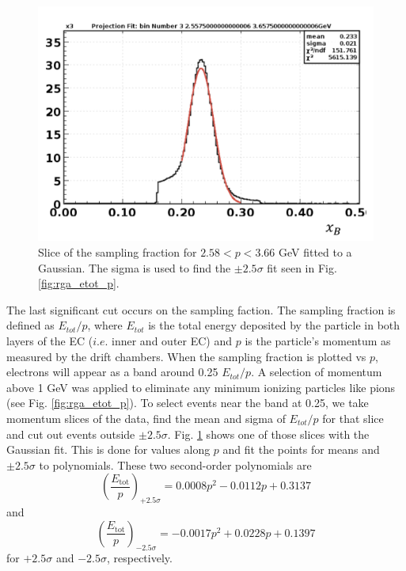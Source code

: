 \begin{figure}[h!]
	\centering
	\includegraphics[width=0.9\linewidth]{figures/rga/Fit_slice_3.png}
	\caption{Slice of the sampling fraction for $2.58<p<3.66$ GeV fitted to a Gaussian. The sigma is used to find the $\pm2.5 \sigma$ fit seen in Fig. \ref{fig:rga_etot_p}.}
	\label{fig:sf_slice}
\end{figure}

The last significant cut occurs on the sampling faction. The sampling fraction is defined as $E_{tot}/p$, where $E_{tot}$ is the total energy deposited by the particle in both layers of the EC ($i.e.$ inner and outer EC) and $p$ is the particle's momentum as measured by the drift chambers. When the sampling fraction is plotted vs $p$, electrons will appear as a band around 0.25 $E_{tot}/p$. A selection of  momentum above 1 GeV was applied to eliminate any minimum ionizing particles like pions (see Fig. \ref{fig:rga_etot_p}). To select events near the band at 0.25, we take momentum slices of the data, find the mean and sigma of $E_{tot}/p$ for that slice and cut out events outside $\pm2.5\sigma$. Fig. \ref{fig:sf_slice} shows one of those slices with the Gaussian fit. This is done for values along $p$ and fit the points for means and $\pm2.5\sigma$ to polynomials. These two second-order polynomials are
\begin{equation}
\left( \frac{E_{\mathrm{tot}}}{p} \right)_{+2.5\sigma} = 0.0008p^2 - 0.0112p + 0.3137
\end{equation}
and
\begin{equation}
\left( \frac{E_{\mathrm{tot}}}{p} \right)_{-2.5\sigma}  = -0.0017p^2 + 0.0228p + 0.1397
\end{equation}
for $+2.5\sigma$ and $-2.5\sigma$, respectively.

